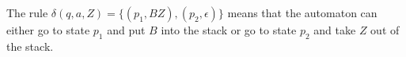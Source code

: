 

\setcounter{section}{6}
\setcounter{subsection}{1}
\setcounter{dfn}{2}

\begin{exl}
The rule $\delta(q, a, Z) = \{(p_1, BZ), (p_2, \epsilon)\}$ means that the automaton can either go to state $p_1$ and put $B$ into the stack
or go to state $p_2$ and take $Z$ out of the stack.
\end{exl}

